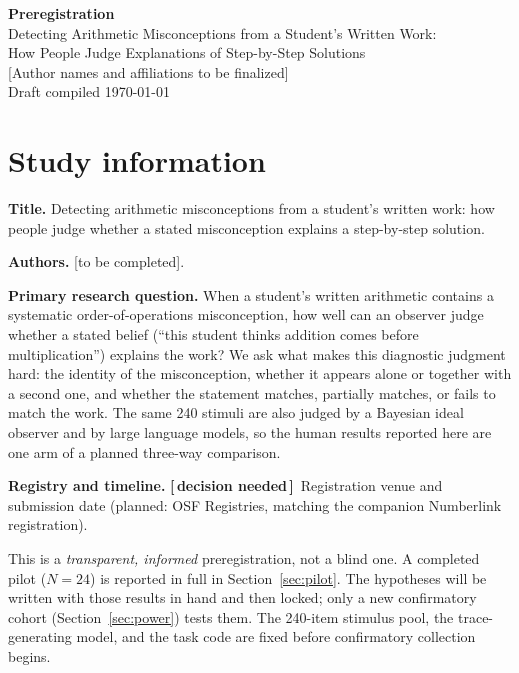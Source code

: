 \documentclass[11pt]{article}
\newcommand{\decflag}{{\small\textbf{\textcolor{decisioncol}{[\,decision needed\,]}}}\ }
\begin{document}
\begin{center}
{\LARGE\bfseries Preregistration}\\[6pt]
{\large Detecting Arithmetic Misconceptions from a Student's Written Work:\\[2pt]
How People Judge Explanations of Step-by-Step Solutions}\\[10pt]
{\normalsize [Author names and affiliations to be finalized]}\\[2pt]
{\small Draft compiled \today}
\end{center}

\section{Study information}\label{sec:info}

\textbf{Title.} Detecting arithmetic misconceptions from a student's written work: how people
judge whether a stated misconception explains a step-by-step solution.

\smallskip
\textbf{Authors.} [to be completed].

\smallskip
\textbf{Primary research question.} When a student's written arithmetic contains a systematic
order-of-operations misconception, how well can an observer judge whether a stated belief
(``this student thinks addition comes before multiplication'') explains the work? We ask what
makes this diagnostic judgment hard: the identity of the misconception, whether it appears
alone or together with a second one, and whether the statement matches, partially matches, or
fails to match the work. The same 240 stimuli are also judged by a Bayesian ideal observer and
by large language models, so the human results reported here are one arm of a planned
three-way comparison.

\smallskip
\textbf{Registry and timeline.} \decflag Registration venue and submission date (planned: OSF
Registries, matching the companion Numberlink registration).

\begin{tcolorbox}[colback=black!4,colframe=black!35,boxrule=0.6pt,
  left=8pt,right=8pt,top=6pt,bottom=6pt,title={\bfseries Type of registration: honesty disclosure}]
\small
This is a \emph{transparent, informed} preregistration, not a blind one. A completed pilot
($N = 24$) is reported in full in Section~\ref{sec:pilot}. The hypotheses will be written with
those results in hand and then locked; only a new confirmatory cohort
(Section~\ref{sec:power}) tests them. The 240-item stimulus pool, the trace-generating model,
and the task code are fixed before confirmatory collection begins.
\end{tcolorbox}
\end{document}
